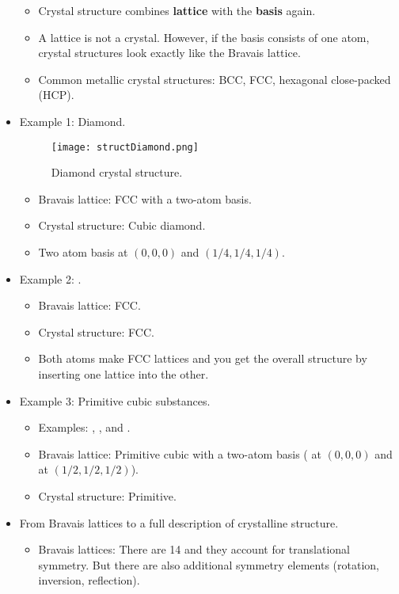 \documentclass[../notes.tex]{subfiles}
\begin{document}
\begin{itemize}
    \begin{itemize}
        \item Crystal structure combines \textbf{lattice} with the \textbf{basis} again.
        \item A lattice is not a crystal. However, if the basis consists of one atom, crystal structures look exactly like the Bravais lattice.
        \item Common metallic crystal structures: BCC, FCC, hexagonal close-packed (HCP).
    \end{itemize}
    \item Example 1: Diamond.
    \begin{figure}[h!]
        \centering
        \texttt{[image: structDiamond.png]}
        \caption{Diamond crystal structure.}
        \label{fig:structDiamond}
    \end{figure}
    \begin{itemize}
        \item Bravais lattice: FCC with a two-atom basis.
        \item Crystal structure: Cubic diamond.
        \item Two atom basis at $(0,0,0)$ and $(1/4,1/4,1/4)$.
    \end{itemize}
    \item Example 2: .
    \begin{itemize}
        \item Bravais lattice: FCC.
        \item Crystal structure: FCC.
        \item Both atoms make FCC lattices and you get the overall structure by inserting one lattice into the other.
    \end{itemize}
    \item Example 3: Primitive cubic substances.
    \begin{itemize}
        \item Examples: , , and .
        \item Bravais lattice: Primitive cubic with a two-atom basis ( at $(0,0,0)$ and  at $(1/2,1/2,1/2)$).
        \item Crystal structure: Primitive.
    \end{itemize}
    \item From Bravais lattices to a full description of crystalline structure.
    \begin{itemize}
        \item Bravais lattices: There are 14 and they account for translational symmetry. But there are also additional symmetry elements (rotation, inversion, reflection).

\end{itemize}
\end{itemize}
\end{document}
